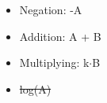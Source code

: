 \begin{itemize}
  \item Negation: -A
  \item Addition: A + B
  \item Multiplying: k$\cdot$B
  \item \sout{log(A)}
\end{itemize}

